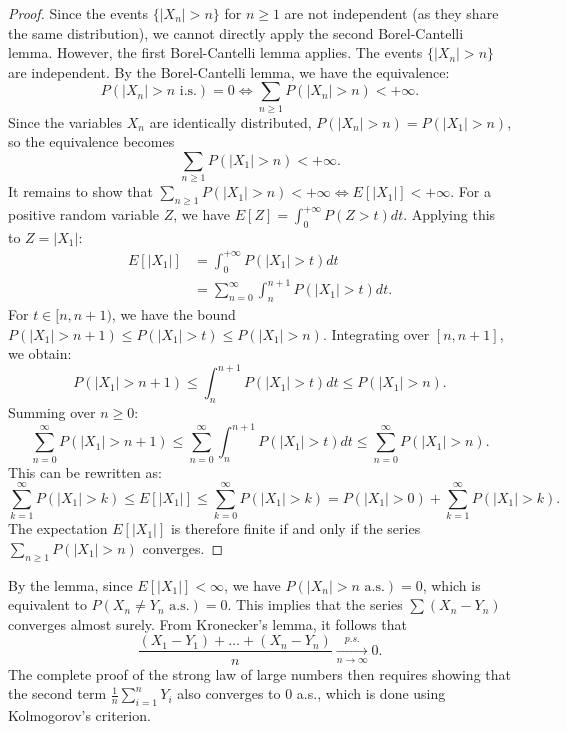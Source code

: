 \begin{proof}
Since the events $\{|X_n| > n\}$ for $n \ge 1$ are not independent (as they share the same distribution), we cannot directly apply the second Borel-Cantelli lemma. However, the first Borel-Cantelli lemma applies. The events $\{|X_n|>n\}$ are independent. By the Borel-Cantelli lemma, we have the equivalence:
\[
P(|X_n| > n \text{ i.s.}) = 0 \iff \sum_{n \ge 1} P(|X_n| > n) < +\infty.
\]
Since the variables $X_n$ are identically distributed, $P(|X_n| > n) = P(|X_1| > n)$, so the equivalence becomes
\[
\sum_{n \ge 1} P(|X_1| > n) < +\infty.
\]
It remains to show that $\sum_{n \ge 1} P(|X_1| > n) < +\infty \iff E[|X_1|] < +\infty$.
For a positive random variable $Z$, we have $E[Z] = \int_0^{+\infty} P(Z > t) dt$. Applying this to $Z = |X_1|$:
\begin{align*}
E[|X_1|] &= \int_0^{+\infty} P(|X_1| > t) dt \\
&= \sum_{n=0}^{\infty} \int_n^{n+1} P(|X_1| > t) dt.
\end{align*}
For $t \in [n, n+1)$, we have the bound $P(|X_1| > n+1) \le P(|X_1| > t) \le P(|X_1| > n)$. Integrating over $[n, n+1]$, we obtain:
\[
P(|X_1| > n+1) \le \int_n^{n+1} P(|X_1| > t) dt \le P(|X_1| > n).
\]
Summing over $n \ge 0$:
\[
\sum_{n=0}^{\infty} P(|X_1| > n+1) \le \sum_{n=0}^{\infty} \int_n^{n+1} P(|X_1| > t) dt \le \sum_{n=0}^{\infty} P(|X_1| > n).
\]
This can be rewritten as:
\[
\sum_{k=1}^{\infty} P(|X_1| > k) \le E[|X_1|] \le \sum_{k=0}^{\infty} P(|X_1| > k) = P(|X_1|>0) + \sum_{k=1}^{\infty} P(|X_1| > k).
\]
The expectation $E[|X_1|]$ is therefore finite if and only if the series $\sum_{n \ge 1} P(|X_1| > n)$ converges.
\end{proof}%

By the lemma, since $E[|X_1|] < \infty$, we have $P(|X_n| > n \text{ a.s.}) = 0$, which is equivalent to $P(X_n \ne Y_n \text{ a.s.}) = 0$.
This implies that the series $\sum (X_n - Y_n)$ converges almost surely. From Kronecker's lemma, it follows that
\[
\frac{(X_1 - Y_1) + \dots + (X_n - Y_n)}{n} \xrightarrow[n\to\infty]{p.s.} 0.
\]
The complete proof of the strong law of large numbers then requires showing that the second term $\frac{1}{n}\sum_{i=1}^n Y_i$ also converges to 0 a.s., which is done using Kolmogorov's criterion.
